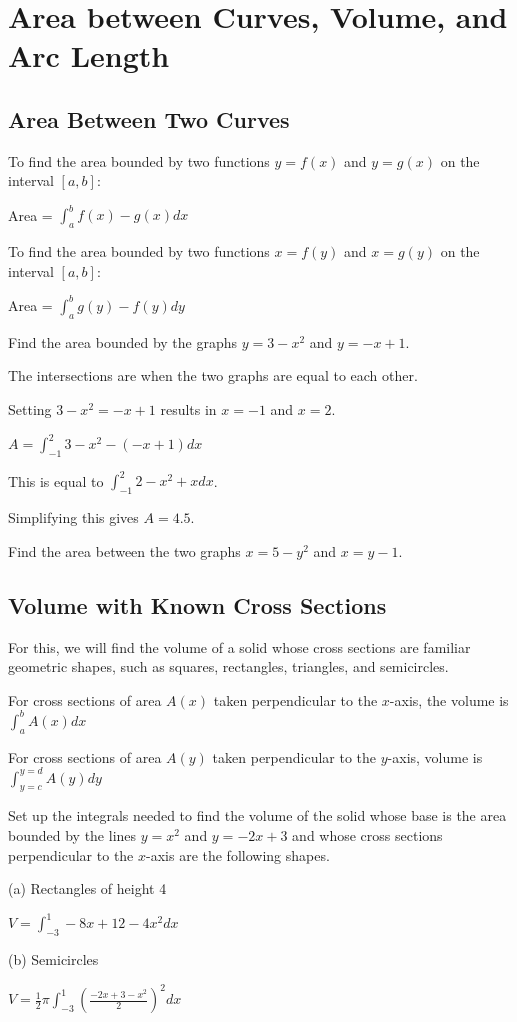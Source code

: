 \documentclass[../bccalc.tex]{subfiles}
\begin{document}
\chapter{Area between Curves, Volume, and Arc Length}
\section{Area Between Two Curves}
To find the area bounded by two functions $y=f(x)$ and $y=g(x)$ on the interval $[a,b]$:

Area = $\int_a^b f(x)-g(x)dx$

To find the area bounded by two functions $x=f(y)$ and $x=g(y)$ on the interval $[a,b]$:

Area = $\int_a^b g(y)-f(y)dy$

\begin{example}
    Find the area bounded by the graphs $y=3-x^2$ and $y=-x+1$.

    The intersections are when the two graphs are equal to each other.

    Setting $3-x^2=-x+1$ results in $x=-1$ and $x=2$.

    $A=\int_{-1}^2 3-x^2-(-x+1)dx$

    This is equal to $\int_{-1}^2 2-x^2+xdx$.

    Simplifying this gives $A=4.5$.
\end{example}

\ex Find the area between the two graphs $x=5-y^2$ and $x=y-1$.

\section{Volume with Known Cross Sections}
For this, we will find the volume of a solid whose cross sections are familiar geometric shapes, such as squares, rectangles, triangles, and semicircles.

For cross sections of area $A(x)$ taken perpendicular to the $x$-axis, the volume is $\int_a^b A(x)dx$

For cross sections of area $A(y)$ taken perpendicular to the $y$-axis, volume is $\int_{y=c}^{y=d}A(y)dy$ 

\begin{example}
    Set up the integrals needed to find the volume of the solid whose base is the area bounded by the lines $y=x^2$ and $y=-2x+3$ and whose cross sections perpendicular to the $x$-axis are the following shapes.

    (a) Rectangles of height 4

    $V=\int_{-3}^1 -8x+12-4x^2dx$

    (b) Semicircles 

    $V=\frac{1}{2}\pi \int_{-3}^1 \left(\frac{-2x+3-x^2}{2}\right)^2 dx$
\end{example}
\end{document}
